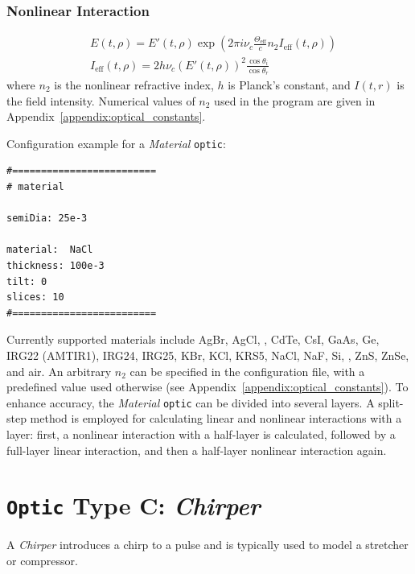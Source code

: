 \documentclass{report}
\begin{document}
\subsubsection{Nonlinear Interaction}
\begin{equation}
 \begin{aligned}
  &E(t,\rho) = E'(t,\rho) \exp\left(2\pi i \nu_c \frac{\Theta_{\text{eff}}}{c} n_2 I_{\text{eff}}(t,\rho)\right)\\
  &I_{\text{eff}}(t,\rho) = 2 h \nu_c (E'(t,\rho))^2 \frac{\cos\theta_i} {\cos\theta_r}
 \end{aligned}
\end{equation}
where \(n_2\) is the nonlinear refractive index, \(h\) is Planck's constant, and \(I(t,r)\) is the field intensity. Numerical values of \(n_2\) used in the program are given in Appendix~\ref{appendix:optical_constants}.

Configuration example for a \textit{Material} \texttt{optic}:

\begin{verbatim}
#=========================
# material

semiDia: 25e-3

material:  NaCl
thickness: 100e-3
tilt: 0
slices: 10
#=========================
\end{verbatim}

Currently supported materials include AgBr, AgCl, , CdTe, CsI, GaAs, Ge, IRG22 (AMTIR1), IRG24, IRG25, KBr, KCl, KRS5, NaCl, NaF, Si, , ZnS, ZnSe, and air. An arbitrary \(n_2\) can be specified in the configuration file, with a predefined value used otherwise (see Appendix~\ref{appendix:optical_constants}). To enhance accuracy, the \textit{Material} \texttt{optic} can be divided into several layers. A split-step method is employed for calculating linear and nonlinear interactions with a layer: first, a nonlinear interaction with a half-layer is calculated, followed by a full-layer linear interaction, and then a half-layer nonlinear interaction again.



\section{\texttt{Optic} Type C: \textit{Chirper}}
A \textit{Chirper} introduces a chirp to a pulse and is typically used to model a stretcher or compressor.
\end{document}

